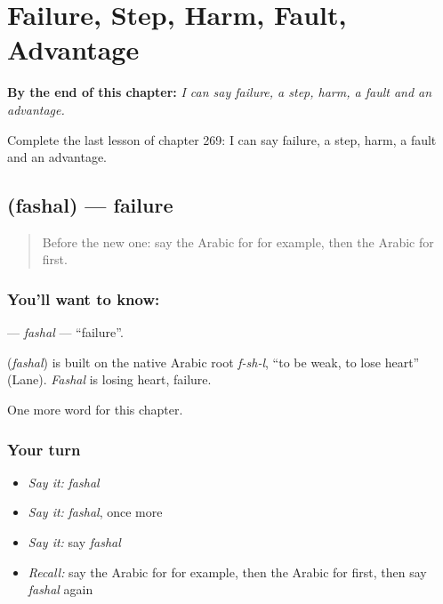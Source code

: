 
\chapter{Failure, Step, Harm, Fault, Advantage}
\label{ch:ar-failure-step-harm-fault-advantage}

\begin{chapteropening}
\textbf{By the end of this chapter:} \emph{I can say failure, a step, harm, a fault and an advantage.}

Complete the last lesson of chapter 269: I can say failure, a step, harm, a fault and an advantage.
\end{chapteropening}

\section[\texorpdfstring{\ar{فشل} (fashal)}{فشل (fashal)}]{ (fashal) — failure}

\label{lesson:AR-C269-fashal}



\begin{quote}
Before the new one: say the Arabic for for example, then the Arabic for first.
\end{quote}

\subsection*{You'll want to know: }
\textbf{} — \emph{fashal} — \textquotedblleft{}failure\textquotedblright{}.

\begin{cousinweb}
\textbf{} (\emph{fashal}) is built on the native Arabic root \emph{f-sh-l}, \textquotedblleft{}to be weak, to lose heart\textquotedblright{} (Lane). \emph{Fashal} is losing heart, failure.
\end{cousinweb}

\begin{grammarlens}[title={What you've built}]
One more word for this chapter.
\end{grammarlens}

\subsection*{Your turn}
\begin{itemize}
\raggedright
  \item \emph{Say it:} \emph{fashal}
  \item \emph{Say it:} \emph{fashal}, once more
  \item \emph{Say it:} say \emph{fashal}
  \item \emph{Recall:} say the Arabic for for example, then the Arabic for first, then say \emph{fashal} again
\end{itemize}

